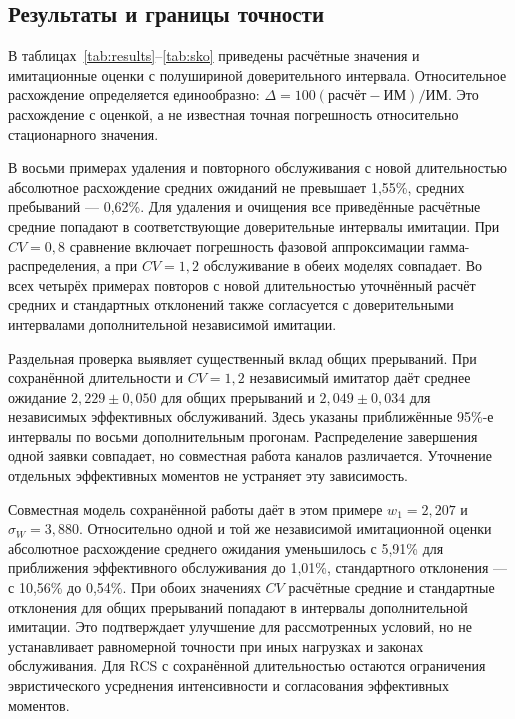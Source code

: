 \subsection{Результаты и границы точности}
В таблицах~\ref{tab:results}--\ref{tab:sko} приведены расчётные значения и имитационные оценки с полушириной доверительного интервала. Относительное расхождение определяется единообразно: \(\Delta=100(\text{расчёт}-\text{ИМ})/\text{ИМ}\). Это расхождение с оценкой, а не известная точная погрешность относительно стационарного значения.

В восьми примерах удаления и повторного обслуживания с новой длительностью абсолютное расхождение средних ожиданий не превышает 1{,}55\%, средних пребываний --- 0{,}62\%. Для удаления и очищения все приведённые расчётные средние попадают в соответствующие доверительные интервалы имитации. При \(CV=0{,}8\) сравнение включает погрешность фазовой аппроксимации гамма-распределения, а при \(CV=1{,}2\) обслуживание в обеих моделях совпадает. Во всех четырёх примерах повторов с новой длительностью уточнённый расчёт средних и стандартных отклонений также согласуется с доверительными интервалами дополнительной независимой имитации.



Раздельная проверка выявляет существенный вклад общих прерываний. При сохранённой длительности и \(CV=1{,}2\) независимый имитатор даёт среднее ожидание \(2{,}229\pm0{,}050\) для общих прерываний и \(2{,}049\pm0{,}034\) для независимых эффективных обслуживаний. Здесь указаны приближённые 95\%-е интервалы по восьми дополнительным прогонам. Распределение завершения одной заявки совпадает, но совместная работа каналов различается. Уточнение отдельных эффективных моментов не устраняет эту зависимость.

Совместная модель сохранённой работы даёт в этом примере \(w_1=2{,}207\) и \(\sigma_W=3{,}880\). Относительно одной и той же независимой имитационной оценки абсолютное расхождение среднего ожидания уменьшилось с 5{,}91\% для приближения эффективного обслуживания до 1{,}01\%, стандартного отклонения --- с 10{,}56\% до 0{,}54\%. При обоих значениях \(CV\) расчётные средние и стандартные отклонения для общих прерываний попадают в интервалы дополнительной имитации. Это подтверждает улучшение для рассмотренных условий, но не устанавливает равномерной точности при иных нагрузках и законах обслуживания. Для RCS с сохранённой длительностью остаются ограничения эвристического усреднения интенсивности и согласования эффективных моментов.

